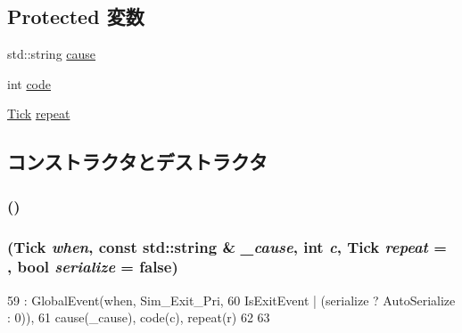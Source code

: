 \subsection*{Protected 変数}
\begin{DoxyCompactItemize}
\item 
std::string \hyperlink{classGlobalSimLoopExitEvent_ae4eec0077e30624726ddd2a0947962e5}{cause}
\item 
int \hyperlink{classGlobalSimLoopExitEvent_a45a5b7c00a796a23f01673cef1dbe0a9}{code}
\item 
\hyperlink{base_2types_8hh_a5c8ed81b7d238c9083e1037ba6d61643}{Tick} \hyperlink{classGlobalSimLoopExitEvent_a186e97c430ff343e8ab14129eaa8375d}{repeat}
\end{DoxyCompactItemize}


\subsection{コンストラクタとデストラクタ}
\hypertarget{classGlobalSimLoopExitEvent_a505db8c8e70f8d5bb7773f37ad2fec75}{
\subsubsection[{GlobalSimLoopExitEvent}]{ ()}}
\label{classGlobalSimLoopExitEvent_a505db8c8e70f8d5bb7773f37ad2fec75}
\hypertarget{classGlobalSimLoopExitEvent_a379d8b91b24d476d6acfaccada92ecac}{
\subsubsection[{GlobalSimLoopExitEvent}]{ ({\bf Tick} {\em when}, \/  const std::string \& {\em \_\-cause}, \/  int {\em c}, \/  {\bf Tick} {\em repeat} = {}, \/  bool {\em serialize} = {\ttfamily false})}}
\label{classGlobalSimLoopExitEvent_a379d8b91b24d476d6acfaccada92ecac}



\begin{DoxyCode}
59     : GlobalEvent(when, Sim_Exit_Pri,
60                   IsExitEvent | (serialize ? AutoSerialize : 0)),
61       cause(_cause), code(c), repeat(r)
62 {
63 }
\end{DoxyCode}


